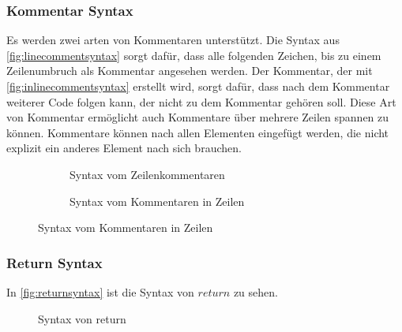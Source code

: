     \subsubsection{Kommentar Syntax}
    \label{sssec:Kommentar Syntax}
      Es werden zwei arten von Kommentaren unterstützt. Die Syntax aus \autoref{fig:linecommentsyntax} sorgt dafür, dass alle folgenden Zeichen, bis zu einem Zeilenumbruch als Kommentar angesehen werden. Der Kommentar, der mit \autoref{fig:inlinecommentsyntax} erstellt wird, sorgt dafür, dass nach dem Kommentar weiterer Code folgen kann, der nicht zu dem Kommentar gehören soll. Diese Art von Kommentar ermöglicht auch Kommentare über mehrere Zeilen spannen zu können. Kommentare können nach allen Elementen eingefügt werden, die nicht explizit ein anderes Element nach sich brauchen.
      \begin{figure}[H]
        \centering
        \begin{minipage}{.45\linewidth}
          \begin{figure}[H]
            \centering
            \caption{Syntax vom Zeilenkommentaren}
            \label{fig:linecommentsyntax}
          \end{figure}
        \end{minipage}%
        \begin{minipage}{.45\linewidth}
          \begin{figure}[H]
            \centering
            \caption{Syntax vom Kommentaren in Zeilen}
            \label{fig:inlinecommentsyntax}
          \end{figure}
        \end{minipage}
      \end{figure}

    \subsubsection{Return Syntax}
    \label{sssec:Return Syntax}
      In \autoref{fig:returnsyntax} ist die Syntax von \myMIn$return$ zu sehen.
      \begin{figure}[H]
        \centering
        \caption{Syntax von return}
        \label{fig:returnsyntax}
      \end{figure}

